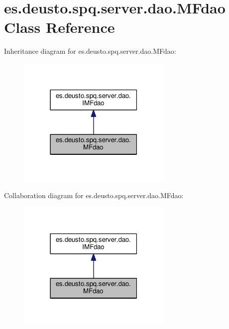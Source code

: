 \hypertarget{classes_1_1deusto_1_1spq_1_1server_1_1dao_1_1_m_fdao}{}\section{es.\+deusto.\+spq.\+server.\+dao.\+M\+Fdao Class Reference}
\label{classes_1_1deusto_1_1spq_1_1server_1_1dao_1_1_m_fdao}


Inheritance diagram for es.\+deusto.\+spq.\+server.\+dao.\+M\+Fdao\+:\nopagebreak
\begin{figure}[H]
\begin{center}
\leavevmode
\includegraphics[width=210pt]{classes_1_1deusto_1_1spq_1_1server_1_1dao_1_1_m_fdao__inherit__graph}
\end{center}
\end{figure}


Collaboration diagram for es.\+deusto.\+spq.\+server.\+dao.\+M\+Fdao\+:\nopagebreak
\begin{figure}[H]
\begin{center}
\leavevmode
\includegraphics[width=210pt]{classes_1_1deusto_1_1spq_1_1server_1_1dao_1_1_m_fdao__coll__graph}
\end{center}
\end{figure}
